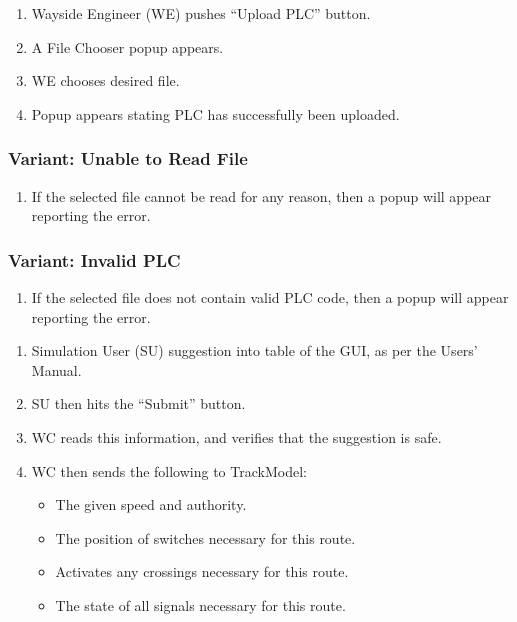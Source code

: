 \documentclass{scrreprt}
\begin{document}
    \begin{enumerate}
        \item Wayside Engineer (WE) pushes ``Upload PLC'' button.
        \item A File Chooser popup appears.
        \item WE chooses desired file.
        \item Popup appears stating PLC has successfully been uploaded.
    \end{enumerate}
    \subsubsection{Variant: Unable to Read File}
    \begin{enumerate}[label = \arabic*a., start = 4]
        \item If the selected file cannot be read for any reason, then a popup will appear reporting the error.
    \end{enumerate}
    \subsubsection{Variant: Invalid PLC}
    \begin{enumerate}[label = \arabic*b., start = 4]
        \item If the selected file does not contain valid PLC code, then a popup will appear reporting the error.
    \end{enumerate}

    \begin{enumerate}
        \item Simulation User (SU) suggestion into table of the GUI, as per the Users' Manual.
        \item SU then hits the ``Submit'' button.
        \item WC reads this information, and verifies that the suggestion is safe.
        \item WC then sends the following to TrackModel:
        \begin{itemize}
            \item The given speed and authority.
            \item The position of switches necessary for this route.
            \item Activates any crossings necessary for this route.
            \item The state of all signals necessary for this route.
        \end{itemize}
    \end{enumerate}
\end{document}
